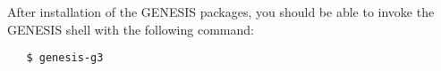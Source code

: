 \documentclass[12pt]{article}
\begin{document}











After installation of the GENESIS packages, you should be able to
invoke the GENESIS shell with the following command:

\begin{verbatim}
   $ genesis-g3
\end{verbatim}
\end{document}
